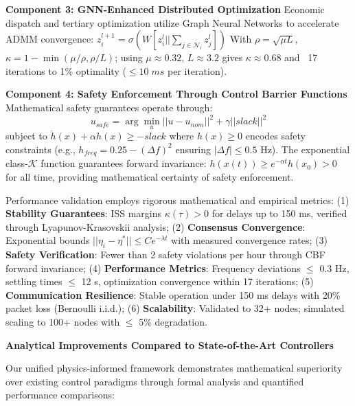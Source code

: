 \documentclass[12pt]{article}
\begin{document}
\textbf{Component 3: GNN-Enhanced Distributed Optimization}
Economic dispatch and tertiary optimization utilize Graph Neural Networks to accelerate ADMM convergence:
$z_i^{l+1} = \sigma(W[z_i^l || \sum_{j \in \mathcal{N}_i} z_j^l])$
With $\rho = \sqrt{\mu L}$, $\kappa = 1 - \min(\mu/\rho, \rho/L)$; using $\mu \approx 0.32$, $L \approx 3.2$ gives $\kappa \approx 0.68$ and ~17 iterations to 1\% optimality ($\leq 10\;ms$ per iteration).

\textbf{Component 4: Safety Enforcement Through Control Barrier Functions}
Mathematical safety guarantees operate through:
$$u_{safe} = \arg\min_u ||u - u_{nom}||^2 + \gamma||slack||^2$$
subject to $\dot{h}(x) + \alpha h(x) \geq -slack$
where $h(x) \geq 0$ encodes safety constraints (e.g., $h_{freq} = 0.25 - (\Delta f)^2$ ensuring $|\Delta f| \leq 0.5$ Hz). The exponential class-$\mathcal{K}$ function guarantees forward invariance: $h(x(t)) \geq e^{-\alpha t}h(x_0) > 0$ for all time, providing mathematical certainty of safety enforcement.

Performance validation employs rigorous mathematical and empirical metrics: (1) \textbf{Stability Guarantees}: ISS margins $\kappa(\tau) > 0$ for delays up to 150 ms, verified through Lyapunov-Krasovskii analysis; (2) \textbf{Consensus Convergence}: Exponential bounds $||\eta_i - \eta^*|| \leq Ce^{-\lambda t}$ with measured convergence rates; (3) \textbf{Safety Verification}: Fewer than 2 safety violations per hour through CBF forward invariance; (4) \textbf{Performance Metrics}: Frequency deviations $\leq$ 0.3 Hz, settling times $\leq$ 12 s, optimization convergence within 17 iterations; (5) \textbf{Communication Resilience}: Stable operation under 150 ms delays with 20\% packet loss (Bernoulli i.i.d.); (6) \textbf{Scalability}: Validated to 32+ nodes; simulated scaling to 100+ nodes with $\leq$ 5\% degradation.

\textbf{Analytical Improvements Compared to State-of-the-Art Controllers}

Our unified physics-informed framework demonstrates mathematical superiority over existing control paradigms through formal analysis and quantified performance comparisons:
\end{document}
